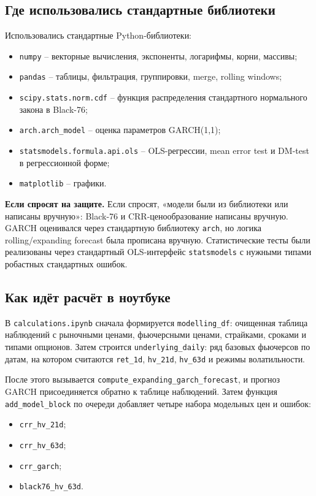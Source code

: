 \documentclass[11pt,a4paper]{article}
\newcommand{\answer}[1]{%
  \vspace{0.15em}
  \noindent\colorbox{softgreen}{%
    \parbox{\dimexpr\linewidth-2\fboxsep\relax}{\textbf{Если спросят на защите.} #1}%
  }\vspace{0.2em}
}
\begin{document}
\subsection{Где использовались стандартные библиотеки}

Использовались стандартные Python-библиотеки:

\begin{itemize}
    \item \texttt{numpy} -- векторные вычисления, экспоненты, логарифмы, корни, массивы;
    \item \texttt{pandas} -- таблицы, фильтрация, группировки, merge, rolling windows;
    \item \texttt{scipy.stats.norm.cdf} -- функция распределения стандартного нормального закона в Black-76;
    \item \texttt{arch.arch\_model} -- оценка параметров GARCH(1,1);
    \item \texttt{statsmodels.formula.api.ols} -- OLS-регрессии, mean error test и DM-test в регрессионной форме;
    \item \texttt{matplotlib} -- графики.
\end{itemize}

\answer{Если спросят, «модели были из библиотеки или написаны вручную»: Black-76 и CRR-ценообразование написаны вручную. GARCH оценивался через стандартную библиотеку \texttt{arch}, но логика rolling/expanding forecast была прописана вручную. Статистические тесты были реализованы через стандартный OLS-интерфейс \texttt{statsmodels} с нужными типами робастных стандартных ошибок.}

\subsection{Как идёт расчёт в ноутбуке}

В \texttt{calculations.ipynb} сначала формируется \texttt{modelling\_df}: очищенная таблица наблюдений с рыночными ценами, фьючерсными ценами, страйками, сроками и типами опционов. Затем строится \texttt{underlying\_daily}: ряд базовых фьючерсов по датам, на котором считаются \texttt{ret\_1d}, \texttt{hv\_21d}, \texttt{hv\_63d} и режимы волатильности.

После этого вызывается \texttt{compute\_expanding\_garch\_forecast}, и прогноз GARCH присоединяется обратно к таблице наблюдений. Затем функция \texttt{add\_model\_block} по очереди добавляет четыре набора модельных цен и ошибок:

\begin{itemize}
    \item \texttt{crr\_hv\_21d};
    \item \texttt{crr\_hv\_63d};
    \item \texttt{crr\_garch};
    \item \texttt{black76\_hv\_63d}.
\end{itemize}
\end{document}
